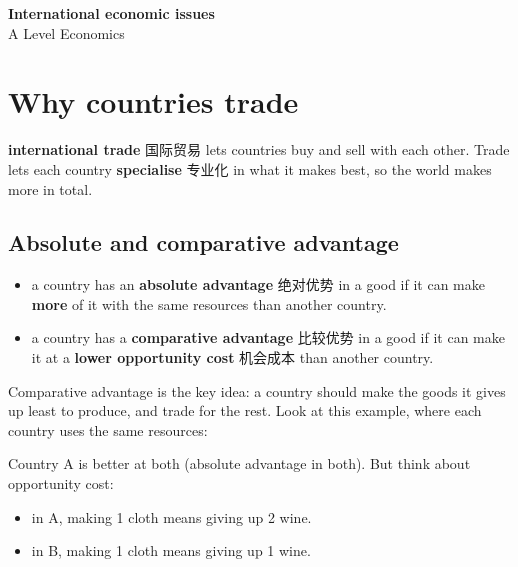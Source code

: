 \documentclass[11pt]{article}
\begin{document}
\begin{center}
  {\LARGE\bfseries International economic issues}\\[0.35em]
  {\large A Level Economics}
\end{center}
\vspace{0.6em}

\section*{Why countries trade}

\textbf{international trade} 国际贸易 lets countries buy and sell with each other. Trade lets each country \textbf{specialise} 专业化 in what it makes best, so the world makes more in total.

\subsection*{Absolute and comparative advantage}

\begin{itemize}
\item a country has an \textbf{absolute advantage} 绝对优势 in a good if it can make \textbf{more} of it with the same resources than another country.

\item a country has a \textbf{comparative advantage} 比较优势 in a good if it can make it at a \textbf{lower opportunity cost} 机会成本 than another country.

\end{itemize}

Comparative advantage is the key idea: a country should make the goods it gives up least to produce, and trade for the rest. Look at this example, where each country uses the same resources:

\begin{center}
\end{center}

Country A is better at both (absolute advantage in both). But think about opportunity cost:

\begin{itemize}
\item in A, making 1 cloth means giving up 2 wine.

\item in B, making 1 cloth means giving up 1 wine.

\end{itemize}
\end{document}

